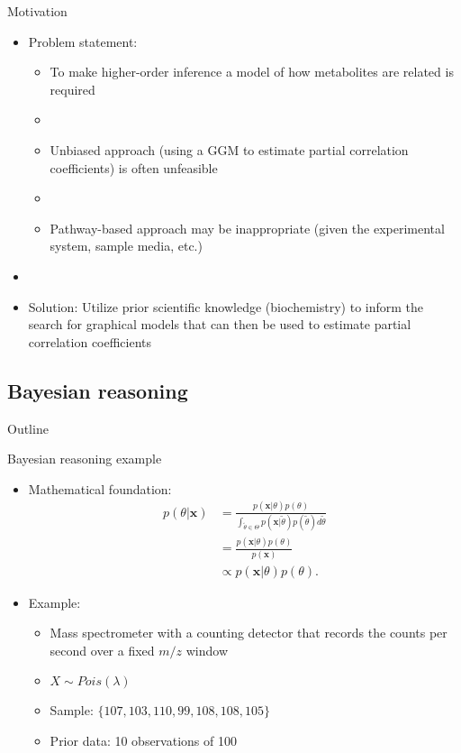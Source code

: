 \documentclass[xcolor=dvipsnames]{beamer}
\begin{document}
\begin{frame}{Motivation}
	\vspace{-15.5pt}
	\begin{itemize}
		\item Problem statement: \pause
		\begin{itemize}
			\item To make higher-order inference a model of how metabolites are related is required \pause
			\item[]
			\item Unbiased approach (using a GGM to estimate partial correlation coefficients) is often unfeasible \pause
			\item[]
			\item Pathway-based approach may be inappropriate (given the experimental system, sample media, etc.) \pause
		\end{itemize}
		\item[]
		\item Solution: Utilize prior scientific knowledge (biochemistry) to inform the search for graphical models that can then be used to estimate partial correlation coefficients
	\end{itemize}
\end{frame}

\subsection{Bayesian reasoning}
\begin{frame}{Outline}
	\vspace{-10.5pt}
	\tableofcontents[currentsection,subsectionstyle=show/shaded/hide]
\end{frame}

\begin{frame}{Bayesian reasoning example}
\vspace{-15pt}
\begin{itemize}
	\item Mathematical foundation:
	\begin{align*}
	p(\theta|\textbf{x})&=\frac{p(\textbf{x}|\theta)p(\theta)}{\int_{\tilde{\theta} \in \Theta} p(\textbf{x}|\tilde{\theta})p(\tilde{\theta})d\tilde{\theta}}\\ &=\frac{p(\textbf{x}|\theta)p(\theta)}{p(\textbf{x})}\\
	&\propto p(\textbf{x}|\theta)p(\theta).
	\end{align*}
	\item Example:
	\begin{itemize}
		\item Mass spectrometer with a counting detector that records the counts per second over a fixed $m/z$ window
		\item $X\sim Pois(\lambda)$
		\item Sample: $\{107, 103, 110, 99, 108, 108, 105\}$
		\item Prior data: 10 observations of 100
	\end{itemize}
\end{itemize}
\end{frame}
\end{document}
